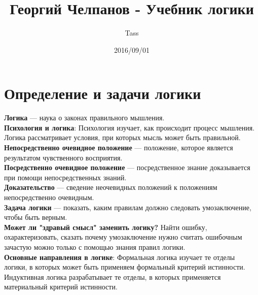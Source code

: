 \documentclass{article}
\begin{document}
\title{Георгий Челпанов - Учебник логики}
\author{Tass}
\date{2016/09/01}
\maketitle

\newpage
\tableofcontents
\newpage

\section{Определение и задачи логики}
\textbf{Логика} --- наука о законах правильного мышления.
\\
\textbf{Психология и логика}: Психология изучает, как происходит процесс мышления. Логика рассматривает условия, при которых мысль может быть правильной.
\\
\textbf{Непосредственно очевидное положение} --- положение, которое является результатом чувственного восприятия.
\\
\textbf{Посредственно очевидное положение} --- посредственное знание доказывается при помощи непосредственных знаний.
\\
\textbf{Доказательство} --- сведение неочевидных положений к положениям непосредственно очевидным.
\\
\textbf{Задача логики} --- показать, каким правилам должно следовать умозаключение, чтобы быть верным.
\\ 
\textbf{Может ли "здравый смысл" заменить логику?} Найти ошибку, охарактеризовать, сказать почему умозаключение нужно считать ошибочным зачастую можно только с помощью знания правил логики.
\\
\textbf{Основные направления в логике}: Формальная логика изучает те отделы логики, в которых может быть применяем формальный критерий истинности. Индуктивная логика разрабатывает те отделы, в которых применяется материальный критерий истинности.
\end{document}
